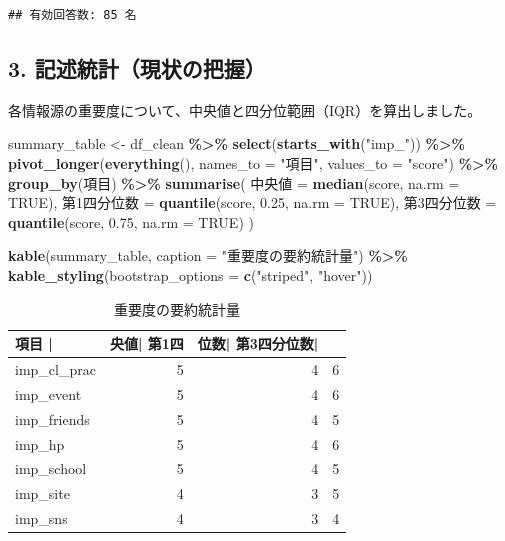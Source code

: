 \documentclass[
]{article}
\newenvironment{Shaded}{\begin{snugshade}}{\end{snugshade}}
\newcommand{\AttributeTok}[1]{\textcolor[rgb]{0.13,0.29,0.53}{#1}}
\newcommand{\ConstantTok}[1]{\textcolor[rgb]{0.56,0.35,0.01}{#1}}
\newcommand{\FloatTok}[1]{\textcolor[rgb]{0.00,0.00,0.81}{#1}}
\newcommand{\FunctionTok}[1]{\textcolor[rgb]{0.13,0.29,0.53}{\textbf{#1}}}
\newcommand{\NormalTok}[1]{#1}
\newcommand{\OtherTok}[1]{\textcolor[rgb]{0.56,0.35,0.01}{#1}}
\newcommand{\SpecialCharTok}[1]{\textcolor[rgb]{0.81,0.36,0.00}{\textbf{#1}}}
\newcommand{\StringTok}[1]{\textcolor[rgb]{0.31,0.60,0.02}{#1}}
\begin{document}
\begin{verbatim}
## 有効回答数: 85 名
\end{verbatim}

\subsection{3.
記述統計（現状の把握）}\label{ux8a18ux8ff0ux7d71ux8a08ux73feux72b6ux306eux628aux63e1}

各情報源の重要度について、中央値と四分位範囲（IQR）を算出しました。

\begin{Shaded}
\begin{Highlighting}[]
\NormalTok{summary\_table }\OtherTok{\textless{}{-}}\NormalTok{ df\_clean }\SpecialCharTok{\%\textgreater{}\%}
  \FunctionTok{select}\NormalTok{(}\FunctionTok{starts\_with}\NormalTok{(}\StringTok{"imp\_"}\NormalTok{)) }\SpecialCharTok{\%\textgreater{}\%}
  \FunctionTok{pivot\_longer}\NormalTok{(}\FunctionTok{everything}\NormalTok{(), }\AttributeTok{names\_to =} \StringTok{"項目"}\NormalTok{, }\AttributeTok{values\_to =} \StringTok{"score"}\NormalTok{) }\SpecialCharTok{\%\textgreater{}\%}
  \FunctionTok{group\_by}\NormalTok{(項目) }\SpecialCharTok{\%\textgreater{}\%}
  \FunctionTok{summarise}\NormalTok{(}
\NormalTok{    中央値 }\OtherTok{=} \FunctionTok{median}\NormalTok{(score, }\AttributeTok{na.rm =} \ConstantTok{TRUE}\NormalTok{),}
\NormalTok{    第1四分位数 }\OtherTok{=} \FunctionTok{quantile}\NormalTok{(score, }\FloatTok{0.25}\NormalTok{, }\AttributeTok{na.rm =} \ConstantTok{TRUE}\NormalTok{),}
\NormalTok{    第3四分位数 }\OtherTok{=} \FunctionTok{quantile}\NormalTok{(score, }\FloatTok{0.75}\NormalTok{, }\AttributeTok{na.rm =} \ConstantTok{TRUE}\NormalTok{)}
\NormalTok{  )}

\FunctionTok{kable}\NormalTok{(summary\_table, }\AttributeTok{caption =} \StringTok{"重要度の要約統計量"}\NormalTok{) }\SpecialCharTok{\%\textgreater{}\%}
  \FunctionTok{kable\_styling}\NormalTok{(}\AttributeTok{bootstrap\_options =} \FunctionTok{c}\NormalTok{(}\StringTok{"striped"}\NormalTok{, }\StringTok{"hover"}\NormalTok{))}
\end{Highlighting}
\end{Shaded}

\begin{longtable}[t]{lrrr}
\caption{\label{tab:summary_stats}重要度の要約統計量}\\
\toprule
項目        | & 央値| 第1四 & 位数| 第3四分位数| & \\
\midrule
imp\_cl\_prac & 5 & 4 & 6\\
imp\_event & 5 & 4 & 6\\
imp\_friends & 5 & 4 & 5\\
imp\_hp & 5 & 4 & 6\\
imp\_school & 5 & 4 & 5\\
\addlinespace
imp\_site & 4 & 3 & 5\\
imp\_sns & 4 & 3 & 4\\
\bottomrule
\end{longtable}
\end{document}
